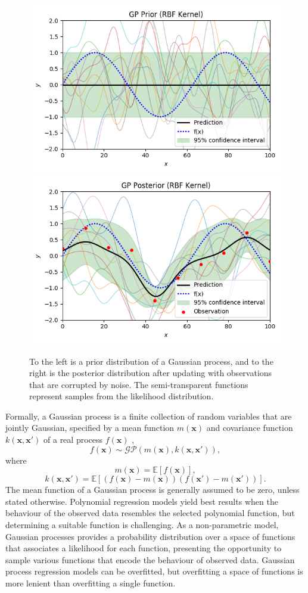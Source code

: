\documentclass[ %
author={Dillon Keith Diep},
supervisor={Dr. Carl Henrik Ek},
degree={MEng},
title={ART-CG:},
subtitle={Assisted Real-time Content Generation of 3D Hair by Learning Manifolds},
type={Research},
year={2017} ]{dissertation}
\begin{document}
\begin{figure}[!h]
	\centering
	\includegraphics[scale=0.5]{images/gpPrior}
	\includegraphics[scale=0.5]{images/gpPosterior}
	\caption{To the left is a prior distribution of a Gaussian process, and to the right is the posterior distribution after updating with observations that are corrupted by noise. The semi-transparent functions represent samples from the likelihood distribution.}
	\label{gpnoisy}
\end{figure}

Formally, a Gaussian process is a finite collection of random variables that are jointly Gaussian, specified by a mean function $m(\bm{x})$ and covariance function $k(\bm{x},\bm{x'})$ of a real process $f(\bm{x})$ \cite[p.13]{gp},
$$f(\bm{x})\sim\mathcal{GP}(m(\bm{x}), k(\bm{x}, \bm{x'})),$$
where
$$m(\bm{x})=\mathbb{E}[f(\bm{x})],$$
$$k(\bm{x},\bm{x'})=\mathbb{E}[(f(\bm{x})-m(\bm{x}))(f(\bm{x'})-m(\bm{x'}))].$$
The mean function of a Gaussian process is generally assumed to be zero, unless stated otherwise.
Polynomial regression models yield best results when the behaviour of the observed data resembles the selected polynomial function, but determining a suitable function is challenging. As a non-parametric model, Gaussian processes provides a probability distribution over a space of functions that associates a likelihood for each function, presenting the opportunity to sample various functions that encode the behaviour of observed data. Gaussian process regression models can be overfitted, but overfitting a space of functions is more lenient than overfitting a single function.
\end{document}
